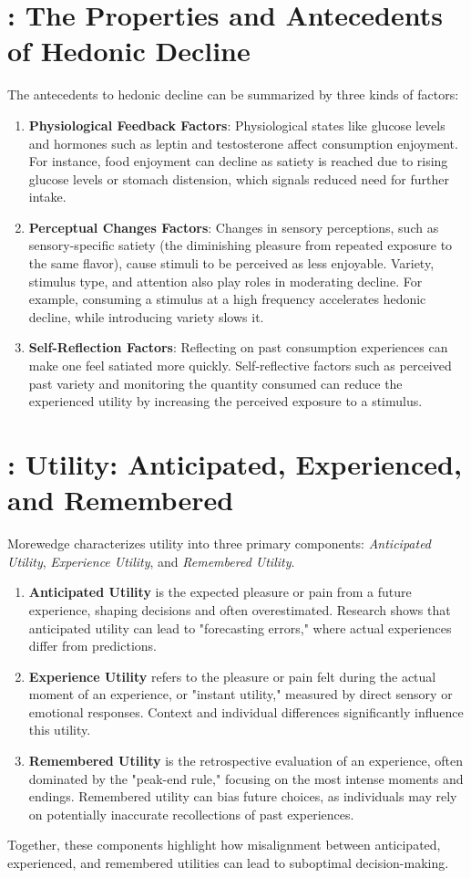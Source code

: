 \documentclass[11pt]{elegantbook}
\begin{document}
\section{\cite{galak2018properties}: The Properties and Antecedents of Hedonic Decline}
The antecedents to hedonic decline can be summarized by three kinds of factors:
\begin{enumerate}
    \item \textbf{Physiological Feedback Factors}: Physiological states like glucose levels and hormones such as leptin and testosterone affect consumption enjoyment. For instance, food enjoyment can decline as satiety is reached due to rising glucose levels or stomach distension, which signals reduced need for further intake.
    \item \textbf{Perceptual Changes Factors}: Changes in sensory perceptions, such as sensory-specific satiety (the diminishing pleasure from repeated exposure to the same flavor), cause stimuli to be perceived as less enjoyable. Variety, stimulus type, and attention also play roles in moderating decline. For example, consuming a stimulus at a high frequency accelerates hedonic decline, while introducing variety slows it.
    \item \textbf{Self-Reflection Factors}: Reflecting on past consumption experiences can make one feel satiated more quickly. Self-reflective factors such as perceived past variety and monitoring the quantity consumed can reduce the experienced utility by increasing the perceived exposure to a stimulus.
\end{enumerate}

\section{\cite{morewedge2015utility}: Utility: Anticipated, Experienced, and Remembered}
Morewedge characterizes utility into three primary components: \textit{Anticipated Utility}, \textit{Experience Utility}, and \textit{Remembered Utility}.
\begin{enumerate}
    \item \textbf{Anticipated Utility} is the expected pleasure or pain from a future experience, shaping decisions and often overestimated. Research shows that anticipated utility can lead to "forecasting errors," where actual experiences differ from predictions.
    \item \textbf{Experience Utility} refers to the pleasure or pain felt during the actual moment of an experience, or "instant utility," measured by direct sensory or emotional responses. Context and individual differences significantly influence this utility.
    \item \textbf{Remembered Utility} is the retrospective evaluation of an experience, often dominated by the "peak-end rule," focusing on the most intense moments and endings. Remembered utility can bias future choices, as individuals may rely on potentially inaccurate recollections of past experiences.
\end{enumerate}
Together, these components highlight how misalignment between anticipated, experienced, and remembered utilities can lead to suboptimal decision-making.
\end{document}
